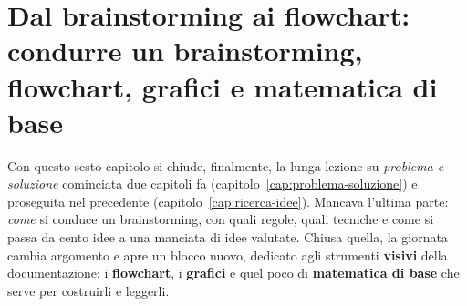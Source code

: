 
\chapter[Dal brainstorming ai flowchart]{Dal brainstorming ai flowchart:
condurre un brainstorming, flowchart, grafici e matematica di base}
\label{cap:brainstorming-flowchart}

Con questo sesto capitolo si chiude, finalmente, la lunga lezione su
\emph{problema e soluzione} cominciata due capitoli fa
(capitolo~\ref{cap:problema-soluzione}) e proseguita nel precedente
(capitolo~\ref{cap:ricerca-idee}). Mancava l'ultima parte: \emph{come} si
conduce un brainstorming, con quali regole, quali tecniche e come si passa
da cento idee a una manciata di idee valutate. Chiusa quella, la giornata
cambia argomento e apre un blocco nuovo, dedicato agli strumenti
\textbf{visivi} della documentazione: i \textbf{flowchart}, i
\textbf{grafici} e quel poco di \textbf{matematica di base} che serve per
costruirli e leggerli.

